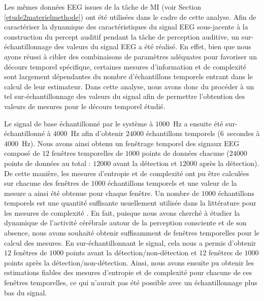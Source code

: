 Les mêmes données EEG issues de la tâche de MI (voir Section \ref{etude2materielmethode}) ont été utilisées dans le cadre de cette analyse. 
Afin de caractériser la dynamique des caractéristiques du signal EEG sous-jacente à la construction du percept auditif pendant la tâche de perception auditive, un sur-échantillonnage des valeurs du signal EEG a été réalisé. 
En effet, bien que nous ayons réussi à cibler des combinaisons de paramètres adéquates pour favoriser un décours temporel spécifique, certaines mesures d'information et de complexité sont largement dépendantes du nombre d'échantillons temporels entrant dans le calcul de leur estimateur. 
Dans cette analyse, nous avons donc du procéder à un tel sur-échantillonnage des valeurs du signal afin de permettre l'obtention des valeurs de mesures pour le décours temporel étudié. 

Le signal de base échantillonné par le système à $1000$~Hz a ensuite été sur-échantillonné à $4000$~Hz afin d'obtenir $24000$ échantillons temporels ($6$~secondes à $4000$~Hz).
Nous avons ainsi obtenu un fenêtrage temporel des signaux EEG composé de $12$ fenêtres temporelles de $1000$ points de données chacune ($24000$ points de données au total : $12000$ avant la détection et $12000$ après la détection). 
De cette manière, les mesures d'entropie et de complexité ont pu être calculées sur chacune des fenêtres de $1000$ échantillons temporels et une valeur de la mesure a ainsi été obtenue pour chaque fenêtre. 
Un nombre de $1000$ échantillons temporels est une quantité suffisante usuellement utilisée dans la littérature pour les mesures de complexité \citep{bruhn2000approximate, pincus1991approximate}. 
En fait, puisque nous avons cherché à étudier la dynamique de l'activité cérébrale autour de la perception consciente et de son absence, nous avons souhaité obtenir suffisamment de fenêtres temporelles pour le calcul des mesures. 
En sur-échantillonnant le signal, cela nous a permis d'obtenir $12$ fenêtres de $1000$ points avant la détection/non-détection et $12$ fenêtres de $1000$ points après la détection/non-détection. 
Ainsi, nous avons ensuite pu obtenir les estimations fiables des mesures d'entropie et de complexité pour chacune de ces fenêtres temporelles, ce qui n'aurait pas été possible avec un échantillonnage plus bas du signal. 

